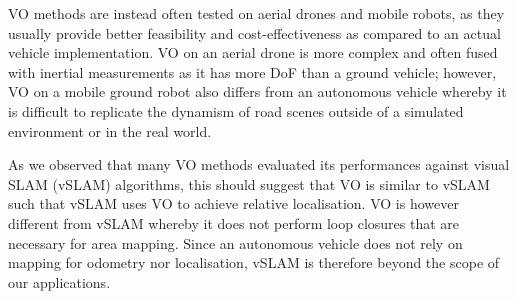 VO methods are instead often tested on aerial drones and mobile robots, as they usually provide better feasibility and cost-effectiveness as compared to an actual vehicle implementation. VO on an aerial drone is more complex and often fused with inertial measurements as it has more DoF than a ground vehicle; however, VO on a mobile ground robot also differs from an autonomous vehicle whereby it is difficult to replicate the dynamism of road scenes outside of a simulated environment or in the real world. 

As we observed that many VO methods evaluated its performances against visual SLAM (vSLAM) algorithms, this should suggest that VO is similar to vSLAM such that vSLAM uses VO to achieve relative localisation. VO is however different from vSLAM whereby it does not perform loop closures that are necessary for area mapping. Since an autonomous vehicle does not rely on mapping for odometry nor localisation, vSLAM is therefore beyond the scope of our applications. 


